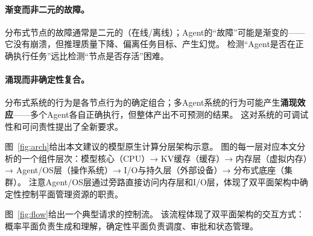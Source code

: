 \paragraph{渐变而非二元的故障。}
分布式节点的故障通常是二元的（在线/离线）；Agent的``故障''可能是渐变的——它没有崩溃，但推理质量下降、偏离任务目标、产生幻觉。
检测``Agent是否在正确执行任务''远比检测``节点是否存活''困难。

\paragraph{涌现而非确定性复合。}
分布式系统的行为是各节点行为的确定组合；多Agent系统的行为可能产生\textbf{涌现效应}——多个Agent各自正确执行，但整体产出不可预测的结果。
这对系统的可调试性和可问责性提出了全新要求。


图~\ref{fig:arch}给出本文建议的模型原生计算分层架构示意。
图的每一层对应本文分析的一个组件层次：模型核心（CPU）→ KV缓存（缓存）→ 内存层（虚拟内存）→ Agent/OS层（操作系统）→ I/O与持久层（外部设备）→ 分布式底座（集群）。
注意Agent/OS层通过旁路直接访问内存层和I/O层，体现了双平面架构中确定性控制平面管理资源的职责。



图~\ref{fig:flow}给出一个典型请求的控制流。
该流程体现了双平面架构的交互方式：概率平面负责生成和理解，确定性平面负责调度、审批和状态管理。


